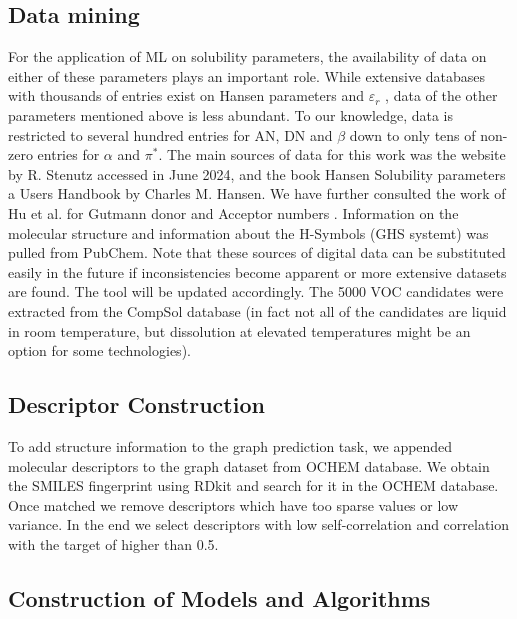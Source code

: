 \documentclass[
  english,        %
  font=times,     %
  onecolumn,      %
]{article}
\begin{document}
\subsection*{Data mining}
For the application of ML on solubility parameters, the availability of data on either of these parameters plays an important role. While extensive databases with thousands of entries exist on Hansen parameters and $\varepsilon _r$ \cite{hansenHansenSolubilityParameters2007,}, data of the other parameters mentioned above is less abundant. To our knowledge, data is restricted to several hundred entries for AN, DN and $\beta$ down to only tens of non-zero entries for $\alpha$ and $\pi^{*}$\cite{StenutzChemTables,huPredictionDonorNumber2024}.  The main sources of data for this work was the website by R. Stenutz\cite{StenutzChemTables} accessed in June 2024,  and the book Hansen Solubility parameters a Users Handbook by Charles M. Hansen\cite{hansenHansenSolubilityParameters2007}. We have further consulted the work of Hu et al. for Gutmann donor and Acceptor numbers \cite{huPredictionDonorNumber2024}. Information on the molecular structure and information about the H-Symbols (GHS systemt) was pulled from PubChem.  Note that these sources of digital data can be substituted easily in the future if inconsistencies become apparent or more extensive datasets are found. The tool will be updated accordingly. The 5000 VOC candidates were extracted from the CompSol database\cite{CompsolDatabaseRevised2024} (in fact not all of the candidates are liquid in room temperature, but dissolution at elevated temperatures might be an option for some technologies).

\subsection*{Descriptor Construction}

To add structure information to the graph prediction task, we appended molecular descriptors to the graph dataset from OCHEM \cite{ochem} database. We obtain the SMILES fingerprint using RDkit and search for it in the OCHEM database. Once matched we remove descriptors which have too sparse values or low variance. In the end we select descriptors with low self-correlation and correlation with the target of higher than 0.5.

\subsection*{Construction of Models and Algorithms}
\end{document}

